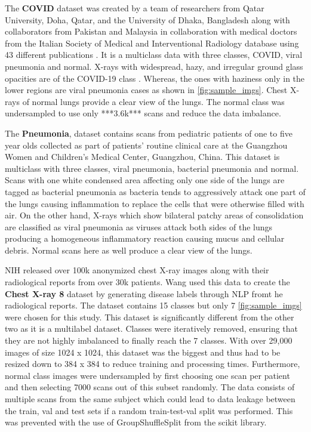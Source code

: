 \documentclass[10pt,twocolumn,letterpaper]{article}
\begin{document}
The \textbf{COVID} dataset was created by a team of researchers from Qatar University, Doha, 
Qatar, and the University of Dhaka, Bangladesh along with collaborators from Pakistan 
and Malaysia in collaboration with medical doctors from the Italian Society of Medical 
and Interventional Radiology database using 43 \cite{covidpneumonia2020data} different 
publications \cite{RAHMAN2021104319,9144185,kagglecovid}. It is a multiclass data with 
three classes, COVID, viral pneumonia and normal. X-rays with widespread, hazy, 
and irregular ground glass opacities are of the COVID-19 class \cite{jacobi2020portable}. 
Whereas, the ones with haziness only in the lower regions \cite{zhan2021clinical} are 
viral pneumonia cases as shown in \cref{fig:sample_imgs}. Chest X-rays of normal lungs provide 
a clear view of the lungs. The normal class was undersampled to use only ***3.6k*** scans and reduce the 
data imbalance.

The \textbf{Pneumonia}, dataset contains scans from pediatric patients of one to five year olds 
collected as part of patients' routine clinical care at the Guangzhou Women and Children's 
Medical Center, Guangzhou, China. \cite{kermany2018labeled,kagglepneu} 
This dataset is multiclass with three classes, viral pneumonia, bacterial pneumonia and normal.
Scans with one white condensed area affecting only one 
side of the lungs are tagged as bacterial pneumonia\cite{areviral} as bacteria tends to 
aggressively attack one part of the lungs causing inflammation to replace the cells 
that were otherwise filled with air. On the other hand, X-rays which 
show bilateral patchy areas of consolidation are classified as viral pneumonia
\cite{guo2012radiological} as viruses attack both sides of the lungs producing a 
homogeneous inflammatory reaction causing mucus and cellular debris. Normal scans here as well 
produce a clear view of the lungs. 

NIH \cite{chestxray2017data} released over 100k anonymized chest X-ray images along with 
their radiological reports from over 30k patients. Wang \etal \cite{wang2017chestx} 
used this data to create the \textbf{Chest X-ray 8} dataset by generating disease labels 
through NLP fromt he radiological reports. \cite{kaggle8} The dataset contains 15 classes but only 
7 \cref{fig:sample_imgs} were chosen for this study. This dataset is significantly different from the 
other two as it is a multilabel dataset. Classes were iteratively removed, ensuring that
they are not highly imbalanced to finally reach the 7 classes. With over 29,000 images of size 
1024 x 1024, this dataset was the biggest and thus had to be resized down to 384 x 384 to 
reduce training and processing times. Furthermore, normal class images were undersampled by first
choosing one scan per patient and then selecting 7000 scans out of this subset randomly. 
The data consists of multiple scans from the same subject which could lead to data leakage between 
the train, val and test sets if a random train-test-val split was performed. 
This was prevented with the use of GroupShuffleSplit from the scikit library. 
\end{document}
